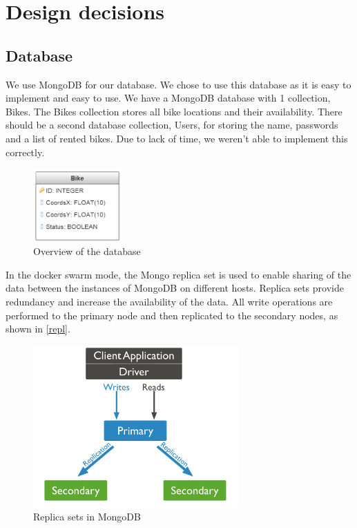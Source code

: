 \section{Design decisions}

\subsection{Database}
We use MongoDB for our database. We chose to use this database as it is easy to implement and easy to use. We have
a MongoDB database with 1 collection, Bikes. The Bikes collection stores all bike locations and their availability. There should be a second database collection, Users, for storing the name, passwords and a list of rented bikes. Due to lack of time, we weren't able to implement this correctly.

    \begin{figure}[H]
		\centering
		\includegraphics[width=0.3\textwidth]{images/db-structure.png}
		\caption{Overview of the database}
		\label{database}
	\end{figure}


In the docker swarm mode, the Mongo replica set is used to enable sharing of the data between the instances of MongoDB on different hosts. Replica sets provide redundancy and increase the availability of the data. All write operations are performed to the primary node and then replicated to the secondary nodes, as shown in \autoref{repl}.

    \begin{figure}[H]
		\centering
		\includegraphics[width=0.7\textwidth]{images/replication.png}
		\caption{Replica sets in MongoDB}
		\label{repl}
	\end{figure}


